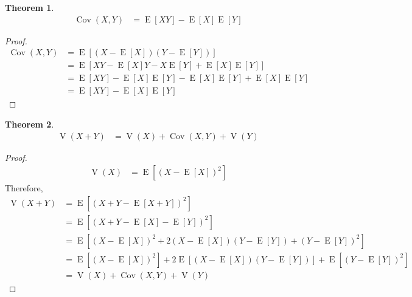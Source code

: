 \documentclass[titlepage, fleqn, a4paper, 12pt, twoside]{article}
\theoremstyle{definition}
\theoremstyle{theorem}
\newtheorem{theorem}{Theorem}
\DeclareMathOperator{\expct}{\mathrm{E}}
\DeclareMathOperator{\var}{\mathrm{V}}
\DeclareMathOperator{\cov}{\mathrm{Cov}}
\begin{document}
\begin{theorem}
	\begin{align*}
		\cov(X,Y) & = \expct[X Y] - \expct[X] \expct[Y]
	\end{align*}
\end{theorem}

\begin{proof}
	\begin{align*}
		\cov(X,Y) & = \expct\left[ \left( X - \expct[X] \right) \left( Y - \expct[Y] \right) \right] \\
                          & = \expct\left[ X Y - \expct[X] Y - X \expct[Y] + \expct[X] \expct[Y] \right]     \\
                          & = \expct[X Y] - \expct[X] \expct[Y] - \expct[X] \expct[Y] + \expct[X] \expct[Y]  \\
                          & = \expct[X Y] - \expct[X] \expct[Y]
	\end{align*}
\end{proof}

\begin{theorem}
	\begin{align*}
		\var(X + Y) & = \var(X) + \cov(X,Y) + \var(Y)
	\end{align*}
\end{theorem}

\begin{proof}
	\begin{align*}
		\var(X) & = \expct\left[ \left( X - \expct[X] \right)^2 \right]
	\end{align*}
	Therefore,
	\begin{align*}
		\var(X + Y) & = \expct\left[ \left( X + Y - \expct[X + Y] \right)^2 \right]                                                                                                                                  \\
                            & = \expct\left[ \left( X + Y - \expct[X] - \expct[Y] \right)^2 \right]                                                                                                                          \\
                            & = \expct\left[ \left( X - \expct[X] \right)^2 + 2 \left( X - \expct[X] \right) \left( Y - \expct[Y] \right) + \left( Y - \expct[Y] \right)^2 \right]                                           \\
                            & = \expct\left[ \left( X - \expct[X] \right)^2 \right] + 2 \expct\left[ \left( X - \expct[X] \right) \left( Y - \expct[Y] \right) \right] + \expct\left[ \left( Y - \expct[Y] \right)^2 \right] \\
                            & = \var(X) + \cov(X,Y) + \var(Y)
	\end{align*}
\end{proof}
\end{document}
